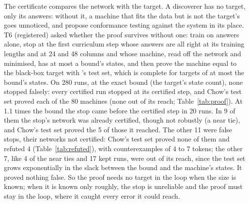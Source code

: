 \documentclass[11pt]{article}
\newcommand{\pn}[2]{#2}
\begin{document}
The certificate compares the network with the target. A discoverer has no target, only its answers:
without it, a machine that fits the data but is not the target's goes unnoticed, and
\citet{aichernig-2024-learning-minimal-automata-rnn} propose conformance testing against the system
in its place.
T6 (registered) asked whether the proof survives without one: train on answers alone, stop at the first
curriculum step whose answers are all right at its training lengths and at 24 and 48 columns and
whose machine, read off the network and minimised, has at most a bound's states, and then prove the machine equal to the black-box target with
\citet{chow-1978-testing-software-design-finite-state-machines}'s test set, which is complete for
targets of at most the bound's states. On \pn{k9.runs}{280} runs, at the exact bound (the target's state count),
\pn{k9.exact-false}{none} stopped falsely: every certified run stopped at its certified step, and
Chow's test set proved each of the \pn{k9.exact-proved}{80} machines (\pn{k9.exact-unproved}{none}
out of its reach; Table~\ref{tab:proof}). At 1.1 times the bound the stop came before the certified
step in \pn{k9.slack-early}{20} runs. In \pn{k9.slack-strict}{9} of them the stop's network was already
certified, though not robustly (a near tie), and Chow's test set proved the
\pn{k9.slack-strict-proved}{5} of those it reached. The other \pn{k9.slack-false}{11} were false stops,
their networks not certified: Chow's test set proved \pn{k9.slack-proved}{none} of them and refuted
\pn{k9.slack-refuted}{4} (Table~\ref{tab:refuted}), with counterexamples of
\pn{k9.counterexamples}{4 to 7} tokens; the other \pn{k9.slack-false-unreached}{7}, like
\pn{k9.slack-strict-unreached}{4} of the near ties and \pn{k9.slack-kept-unreached}{17} kept runs, were
out of its reach, since the test set grows exponentially in the slack
between the bound and the machine's states. It proved nothing false. So the proof needs no target in the loop when the size is known; when it is known only roughly, the
stop is unreliable and the proof must stay in the loop, where it caught every error it could reach.
\end{document}
